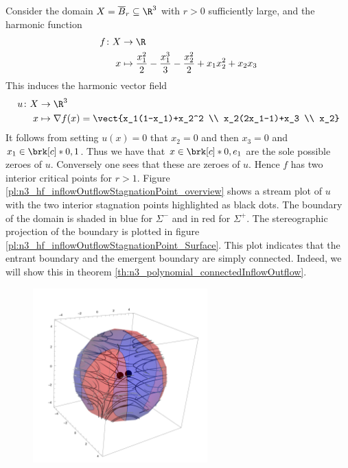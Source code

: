 \begin{example}\label{ex:n3_polynomial_defn}
  Consider the domain $X=\overline{B}_r\subseteq\R^3$ with $r>0$ sufficiently large, and the harmonic function
  \begin{align}
    \begin{aligned}
    f\colon X&\to\R \\
    x&\mapsto \frac{x_1^2}{2}-\frac{x_1^3}{3}-\frac{x_2^2}{2}+x_1x_2^2+x_2x_3
    \end{aligned}
    \label{eq:n3_polynomial_defnf}
  \end{align}
  This induces the harmonic vector field
  \begin{align*}
    u\colon X&\to\R^3 \\
    x&\mapsto\nabla f(x)=\vect{x_1(1-x_1)+x_2^2 \\
      x_2(2x_1-1)+x_3 \\
      x_2}
  \end{align*}
  It follows from setting $u(x)=0$ that $x_2=0$
  and then $x_3=0$ and $x_1\in\brk[c]*{0,1}$. Thus we have that $x\in\brk[c]*{0,e_1}$
  are the sole possible zeroes of $u$. Conversely one sees that these are zeroes of $u$.
  Hence $f$ has two interior critical points for $r>1$.
  Figure \ref{pl:n3_hf_inflowOutflowStagnationPoint_overview}
  shows a stream plot of $u$ with the two interior stagnation points highlighted as black dots.
  The boundary of the domain is shaded in blue for $\Sigma^-$ and in red for $\Sigma^+$.
  The stereographic projection of the boundary is plotted in figure \ref{pl:n3_hf_inflowOutflowStagnationPoint_Surface}.
  This plot indicates that the entrant boundary and the emergent boundary are simply connected.
  Indeed, we will show this in theorem \ref{th:n3_polynomial_connectedInflowOutflow}.
  \begin{figure}
    \centering
    \includegraphics[width=0.6\textwidth]{../plots/n3_hf_inflowOutflow_Ball_overview.pdf}

\end{figure}
\end{example}
